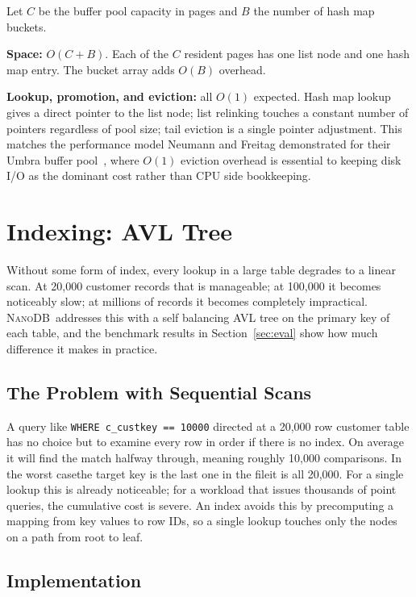\documentclass[conference]{IEEEtran}
\newcommand{\NanoDB}{\textsc{NanoDB}}
\newcommand{\code}[1]{\texttt{#1}}
\begin{document}
Let $C$ be the buffer pool capacity in pages and $B$ the number of hash map
buckets.

\textbf{Space:} $O(C + B)$. Each of the $C$ resident pages has one list node and
one hash map entry. The bucket array adds $O(B)$ overhead.

\textbf{Lookup, promotion, and eviction:} all $O(1)$ expected. Hash map lookup
gives a direct pointer to the list node; list relinking touches a constant number
of pointers regardless of pool size; tail eviction is a single pointer
adjustment. This matches the performance model Neumann and Freitag demonstrated
for their Umbra buffer pool~\cite{neumann2020}, where $O(1)$ eviction overhead
is essential to keeping disk I/O as the dominant cost rather than CPU side
bookkeeping.

\section{Indexing: AVL Tree}

Without some form of index, every lookup in a large table degrades to a linear
scan. At 20,000 customer records that is manageable; at 100,000 it becomes
noticeably slow; at millions of records it becomes completely impractical. \NanoDB\
addresses this with a self balancing AVL tree on the primary key of each table,
and the benchmark results in Section~\ref{sec:eval} show how much difference it
makes in practice.

\subsection{The Problem with Sequential Scans}

A query like \code{WHERE c\_custkey == 10000} directed at a 20,000 row customer
table has no choice but to examine every row in order if there is no index. On
average it will find the match halfway through, meaning roughly 10,000
comparisons. In the worst casethe target key is the last one in the
fileit is all 20,000. For a single lookup this is already noticeable; for a
workload that issues thousands of point queries, the cumulative cost is severe.
An index avoids this by precomputing a mapping from key values to row IDs, so a
single lookup touches only the nodes on a path from root to leaf.

\subsection{Implementation}
\end{document}
